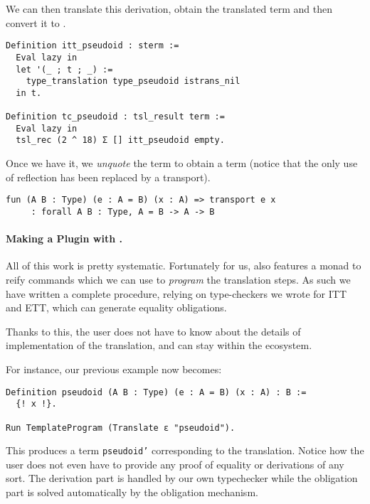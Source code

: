 %
We can then translate this derivation, obtain the translated term and then
convert it to \MetaCoq.
%
\begin{verbatim}
Definition itt_pseudoid : sterm :=
  Eval lazy in
  let '(_ ; t ; _) :=
    type_translation type_pseudoid istrans_nil
  in t.

Definition tc_pseudoid : tsl_result term :=
  Eval lazy in
  tsl_rec (2 ^ 18) Σ [] itt_pseudoid empty.
\end{verbatim}
%
Once we have it, we \emph{unquote} the term to obtain a \Coq term
(notice that the only use of reflection has been replaced by a transport).
%
\begin{verbatim}
fun (A B : Type) (e : A = B) (x : A) => transport e x
     : forall A B : Type, A = B -> A -> B
\end{verbatim}

\paragraph{Making a Plugin with \MetaCoq.}
%
All of this work is pretty systematic. Fortunately for us,
\MetaCoq also features a monad to reify \Coq commands which we can
use to \emph{program} the translation steps.
As such we have written a complete procedure, relying on type-checkers we
wrote for \acrshort{ITT} and \acrshort{ETT}, which can generate equality
obligations.

Thanks to this, the user does not have to know about the details of
implementation of the translation, and can stay within the \Coq ecosystem.

For instance, our previous example now becomes:
%
\begin{verbatim}
Definition pseudoid (A B : Type) (e : A = B) (x : A) : B :=
  {! x !}.

Run TemplateProgram (Translate ε "pseudoid").
\end{verbatim}
%
This produces a \Coq term \texttt{pseudoid'} corresponding to the
translation.
Notice how the user does not even have to provide any proof of equality or
derivations of any sort. The derivation part is handled by our own typechecker
while the obligation part is solved automatically by the \Coq obligation mechanism.


